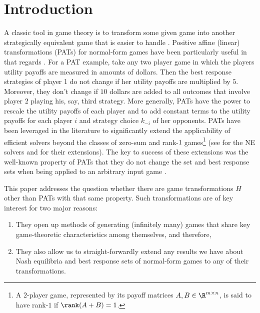 


\section{Introduction}
\label{sec:introduction}

A classic tool in game theory is to transform some given game into another strategically equivalent game that is easier to handle \cite{10.2307/j.ctt1r2gkx}. Positive affine (linear) transformations (PATs) for normal-form games have been particularly useful in that regards \cite{Aumann1961AlmostSC, 10.1007/978-3-642-10841-9_44}. For a PAT example, take any two player game in which the players utility payoffs are measured in amounts of dollars. Then the best response strategies of player 1 do not change if her utility payoffs are multiplied by $5$. Moreover, they don't change if $10$ dollars are added to all outcomes that involve player $2$ playing his, say, third strategy. More generally, PATs have the power to rescale the utility payoffs of each player and to add constant terms to the utility payoffs for each player $i$ and strategy choice $k_{-i}$ of her opponents. PATs have been leveraged in the literature to significantly extend the applicability of efficient \NE{} solvers beyond the classes of zero-sum and rank-$1$ games\footnote{A $2$-player game, represented by its payoff matrices $A,B \in \R^{m \times n}$, is said to have rank-$1$ if $\rank(A+B) = 1$.} (see \cite{Neumann1928, Dantzig51, Adler2013, 2011, main} for the NE solvers and \cite{moulin, KONTOGIANNIS201264, heyman} for their extensions). The key to success of these extensions was the well-known property of PATs that they do not change the \NE{} set and best response sets when being applied to an arbitrary input game \cite{heyman, maschler_solan_zamir_2013, harsanyi1988general, DynGT}.

This paper addresses the question whether there are game transformations $H$ other than PATs with that same property. Such transformations are of key interest for two major reasons:
\begin{enumerate}
    \item They open up methods of generating (infinitely many) games that share key game-theoretic characteristics among themselves, and therefore,
    \item They also allow us to straight-forwardly extend any results we have about Nash equilibria and best response sets of normal-form games to any of their transformations.
\end{enumerate}

